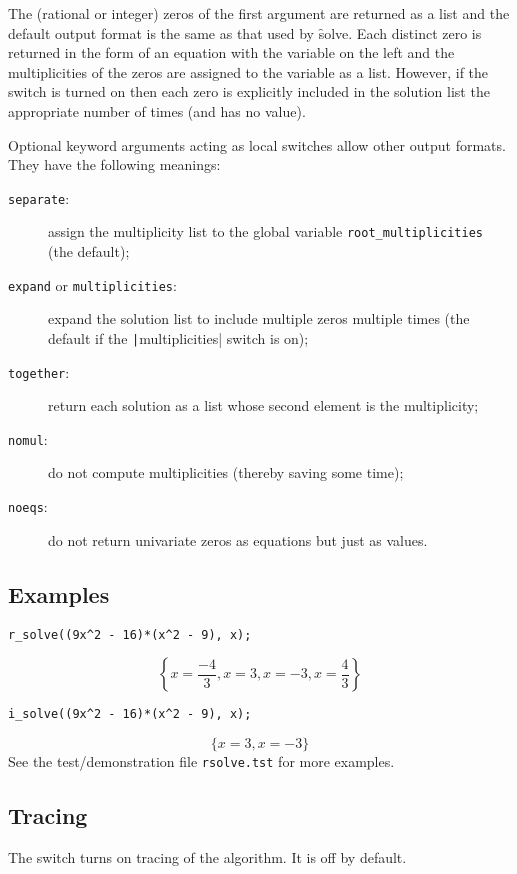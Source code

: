 The (rational or integer) zeros of the first argument are returned as
a list and the default output format is the same as that used by
\f{solve}.  Each distinct zero is returned in the form of an
equation with the variable on the left and the multiplicities of the
zeros are assigned to the variable  as a
list.  However, if the switch  is turned on then
each zero is explicitly included in the solution list the appropriate
number of times (and  has no value).
  
\begin{sloppypar}
Optional keyword arguments acting as local switches allow other output
formats.  They have the following meanings:
\begin{description}
\item[\texttt{separate}:] assign the multiplicity list to the global
  variable \texttt{root\_multiplicities} (the default);
\item[\texttt{expand} or \texttt{multiplicities}:] expand the solution
  list to include multiple zeros multiple times (the default if the
  \texttt|multiplicities| switch is on);
\item[\texttt{together}:] return each solution as a list whose second
  element is the multiplicity;
\item[\texttt{nomul}:] do not compute multiplicities (thereby saving
  some time);
\item[\texttt{noeqs}:] do not return univariate zeros as equations but
  just as values.
\end{description}
\end{sloppypar}


\subsection{Examples}

\begin{verbatim}
r_solve((9x^2 - 16)*(x^2 - 9), x);
\end{verbatim}
\[
  \left\{x=\frac{-4}{3},x=3,x=-3,x=\frac{4}{3}\right\}
\]
\begin{verbatim}
i_solve((9x^2 - 16)*(x^2 - 9), x);
\end{verbatim}
\[
  \{x=3,x=-3\}
\]
See the test/demonstration file \verb|rsolve.tst| for more examples.


\subsection{Tracing}

\hypertarget{switch:TRSOLVE}{}
The switch  turns on tracing of the algorithm.  It is off
by default.

